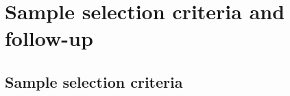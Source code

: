 \documentclass{aa}    %
\begin{document}
%
%
%

\section{Sample selection criteria and follow-up}


\subsection{Sample selection criteria} \label{samplecrit}
\end{document}
